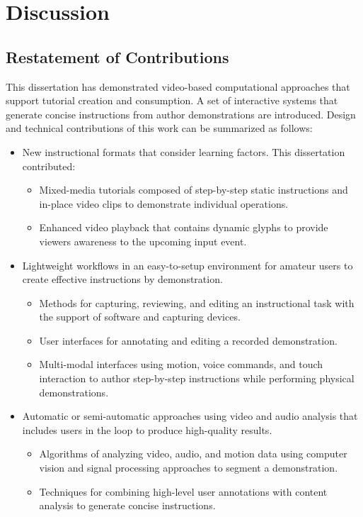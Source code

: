 \chapter{Discussion}
\label{chapter_conclusion}

\section{Restatement of Contributions}
This dissertation has demonstrated video-based computational approaches that support tutorial creation and consumption. A set of interactive systems that generate concise instructions from author demonstrations are introduced. Design and technical contributions of this work can be summarized as follows:

\begin{itemize}
  \item New instructional formats that consider learning factors. This dissertation contributed:
    \begin{itemize}
      \item Mixed-media tutorials composed of step-by-step static instructions and in-place video clips to demonstrate individual operations.
      \item Enhanced video playback that contains dynamic glyphs to provide viewers awareness to the upcoming input event.
    \end{itemize}
  \item Lightweight workflows in an easy-to-setup environment for amateur users to create effective instructions by demonstration.
    \begin{itemize}
      \item Methods for capturing, reviewing, and editing an instructional task with the support of software and capturing devices.
      \item User interfaces for annotating and editing a recorded demonstration.
      \item Multi-modal interfaces using motion, voice commands, and touch interaction to author step-by-step instructions while performing physical demonstrations.
    \end{itemize}
  \item Automatic or semi-automatic approaches using video and audio analysis that includes users in the loop to produce high-quality results.
    \begin{itemize}
      \item Algorithms of analyzing video, audio, and motion data using computer vision and signal processing approaches to segment a demonstration.
      \item Techniques for combining high-level user annotations with content analysis to generate concise instructions.
    \end{itemize}
\end{itemize}

